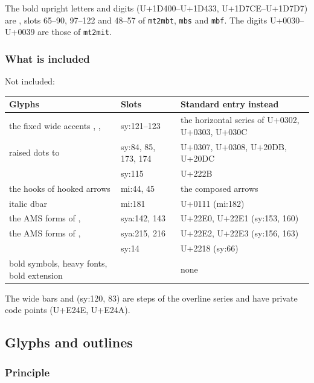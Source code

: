 \documentclass[10pt]{article}
\newcommand\file[1]{\texttt{#1}}
\newcommand\code[1]{\texttt{#1}}
\newcommand\U[1]{U+#1}
\begin{document}
The bold upright letters and digits (\U{1D400}--\U{1D433},
\U{1D7CE}--\U{1D7D7}) are \code{\string\mbf}, slots 65--90, 97--122 and
48--57 of \file{mt2mbt}, \file{mbs} and \file{mbf}.  The digits
\U{0030}--\U{0039} are those of \file{mt2mit}.

\subsubsection{What is included}\label{app:included}

Not included:

\begin{center}
\begin{tabularx}{\textwidth}{Xll}
\toprule
Glyphs & Slots & Standard entry instead \\
\midrule
the fixed wide accents \code{\string\what}, \code{\string\wtilde},
  \code{\string\wcheck} & sy:121--123 & the horizontal series of
  \U{0302}, \U{0303}, \U{030C} \\
raised dots \code{\string\dotup} to \code{\string\ddddotup} &
  sy:84, 85, 173, 174 & \U{0307}, \U{0308}, \U{20DB}, \U{20DC} \\
\code{\string\smallint} & sy:115 & \U{222B} \\
the hooks of hooked arrows & mi:44, 45 & the composed arrows \\
italic dbar & mi:181 & \U{0111} (mi:182) \\
the AMS forms of \code{\string\npreceq}, \code{\string\nsucceq} &
  sya:142, 143 & \U{22E0}, \U{22E1} (sy:153, 160) \\
the AMS forms of \code{\string\nsqsubset}, \code{\string\nsqsupset} &
  sya:215, 216 & \U{22E2}, \U{22E3} (sy:156, 163) \\
\code{\string\openbullet} & sy:14 & \U{2218} (sy:66) \\
bold symbols, heavy fonts, bold extension & & none \\
\bottomrule
\end{tabularx}
\end{center}

The wide bars \code{\string\wbar} and \code{\string\wwbar} (sy:120,
83) are steps of the overline series and have private code points
(\U{E24E}, \U{E24A}).

\subsection{Glyphs and outlines}
\subsubsection{Principle}\label{sec:principle}
\end{document}
